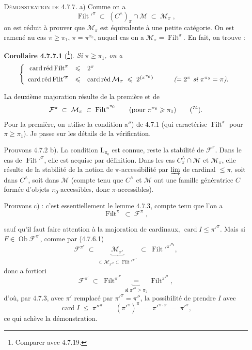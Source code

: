 \documentclass[11pt]{article}
\newcommand{\printedpage}[1]{\marginpar{\footnotesize p.~#1}}
\newcommand{\msp}[1]{\marginpar{\footnotesize [#1]}}
\newcommand{\Filt}{\operatorname{Filt}}
\newcommand{\card}{\operatorname{card}}
\newcommand{\Ob}{\operatorname{Ob}}
\newcommand{\cardred}{\mathop{\mathrm{card}\,\textup{réd}}\nolimits}
\begin{document}
\textsc{Démonstration de} 4.7.7. a) Comme on a
\[
\Filt'^{\pi} \;\subset\; (C^{\wedge})_{\pi} \cap \mathcal{M} \;\subset\; \mathcal{M}_{\pi} \;,
\]
on est réduit à prouver que $\mathcal{M}_{\pi}$ est équivalente à une petite catégorie. On est ramené au cas $\pi \geqslant \pi_1$, $\pi = \pi^{\pi_0}$, auquel cas on a $\mathcal{M}_{\pi} = \Filt^{\pi}$. En fait, on trouve :

\textbf{Corollaire 4.7.7.1} (\footnote[73]{Comparer avec 4.7.19.}). \textit{Si $\pi \geqslant \pi_1$, on a}
\[
\left\{
\begin{array}{rcll}
\cardred \Filt^{\pi} & \leqslant & 2^{\pi} & \\[4pt]
\cardred \Filt'^{\pi} & \leqslant & \cardred \mathcal{M}_{\pi} \;\leqslant\; 2^{(\pi^{\pi_0})} & \qquad \textit{($= 2^{\pi}$ si $\pi^{\pi_0} = \pi$).}
\end{array}
\right.
\]

La deuxième majoration résulte de la première et de
\[
\mathcal{F}^{\pi} \;\subset\; \mathcal{M}_{\pi} \;\subset\; \Filt^{\pi^{\pi_0}} \qquad (\text{pour } \pi^{\pi_0} \geqslant \pi_1) \qquad \text{(\footnotemark[74]).}
\]
Pour la première, on utilise la condition a$''$) de 4.7.1 (qui caractérise $\Filt^{\pi}$ pour $\pi \geqslant \pi_1$). Je passe sur les détails de la vérification.

\msp{page 174}
Prouvons 4.7.2 b). La condition $\mathrm{L}_{\pi_0}$ est connue, reste la stabilité de $\mathcal{F}^{\pi}$. Dans le cas de $\Filt'^{\pi}$, elle est acquise par définition. Dans les cas $C^{\wedge}_{\pi} \cap \mathcal{M}$ et $\mathcal{M}_{\pi}$, elle résulte de la stabilité de la notion de $\pi$-accessibilité par $\varinjlim$ de cardinal $\leqslant \pi$, soit dans $C^{\wedge}$, soit dans $\mathcal{M}$ (compte tenu que $C^{\wedge}$ et $\mathcal{M}$ ont une famille génératrice $C$ formée d’objets $\pi_0$-accessibles, donc $\pi$-accessibles).

Prouvons c) : c’est essentiellement le lemme 4.7.3, compte tenu que l’on a
\[
\Filt^{\pi} \;\subset\; \mathcal{F}^{\pi} \;,
\]

\noindent\printedpage{59}
sauf qu'il faut faire attention à la majoration de cardinaux, $\card I \leqslant \pi'^{\pi}$. Mais si $F \in \Ob\mathcal{F}^{\pi'}$, comme par (4.7.6.1)
\[
\mathcal{F}^{\pi'} \;\subset\; \underbrace{\mathcal{M}_{\pi'}}_{\subset\mathcal{M}_{\pi'^{\pi}}\subset\Filt'^{\pi'^{\pi}}} \;\subset\; \Filt'^{\pi'^{\pi_0}} ,
\]
donc a fortiori
\[
\mathcal{F}^{\pi'} \;\subset\; \Filt^{\pi'^{\pi}} \underbrace{\;=\;}_{\text{si } \pi'^{\pi}\geqslant\pi_1} \Filt^{\pi'^{\pi}} , %
\]
d'où, par 4.7.3, avec $\pi'$ remplacé par $\pi'^{\pi}=\pi''$, la possibilité de prendre $I$ avec
\[
\card I \;\leqslant\; \pi''^{\pi} \;=\; (\pi'^{\pi})^{\pi} \;=\; \pi'^{\pi\cdot\pi} \;=\; \pi'^{\pi} ,
\]
ce qui achève la démonstration.
\end{document}
